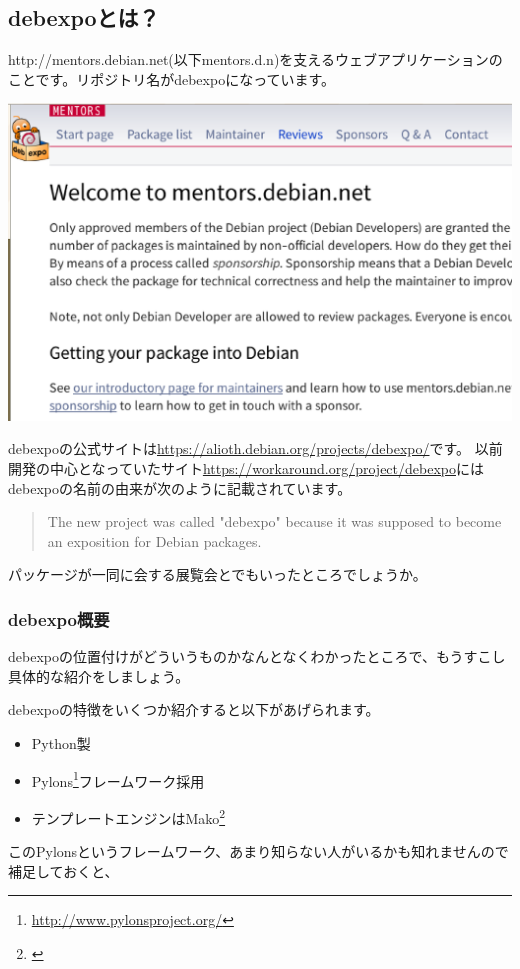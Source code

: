 \documentclass[mingoth,a4paper]{jsarticle}
\begin{document}
\subsection{debexpoとは？}

http://mentors.debian.net(以下mentors.d.n)を支えるウェブアプリケーションのことです。リポジトリ名がdebexpoになっています。

\begin{center}
\includegraphics[width=0.5\hsize]{image201606/mentors.d.n.eps}
\end{center}

debexpoの公式サイトは\url{https://alioth.debian.org/projects/debexpo/}です。
以前開発の中心となっていたサイト\url{https://workaround.org/project/debexpo}にはdebexpoの名前の由来が次のように記載されています。

\begin{quotation}
The new project was called "debexpo" because it was supposed to become an {\color{red}expo}sition for {\color{red}Deb}ian packages.
\end{quotation}

パッケージが一同に会する展覧会とでもいったところでしょうか。

\subsubsection{debexpo概要}

debexpoの位置付けがどういうものかなんとなくわかったところで、もうすこし具体的な紹介をしましょう。

debexpoの特徴をいくつか紹介すると以下があげられます。

\begin{itemize}
\item Python製
\item Pylons\footnote{\url{http://www.pylonsproject.org/}}フレームワーク採用
\item テンプレートエンジンはMako\footnote{\url{}}
\end{itemize}

このPylonsというフレームワーク、あまり知らない人がいるかも知れませんので補足しておくと、
\end{document}
